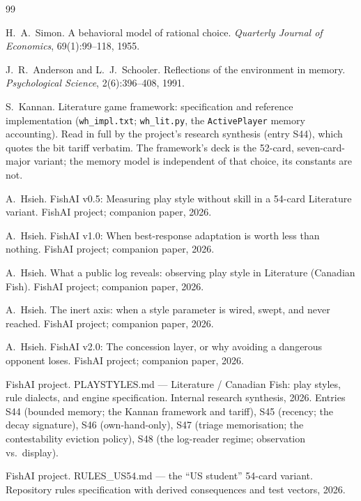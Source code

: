 \documentclass[11pt]{article}
\newcommand{\code}[1]{\texttt{#1}}
\begin{document}
\begin{thebibliography}{99}
\footnotesize

H.~A.~Simon.
\newblock A behavioral model of rational choice.
\newblock \emph{Quarterly Journal of Economics}, 69(1):99--118, 1955.

J.~R.~Anderson and L.~J.~Schooler.
\newblock Reflections of the environment in memory.
\newblock \emph{Psychological Science}, 2(6):396--408, 1991.

S.~Kannan.
\newblock Literature game framework: specification and reference implementation
(\code{wh\_impl.txt}; \code{wh\_lit.py}, the \code{ActivePlayer} memory accounting).
\newblock Read in full by the project's research synthesis \cite{playstyles} (entry
S44), which quotes the bit tariff verbatim. The framework's deck is the 52-card,
seven-card-major variant; the memory model is independent of that choice, its
constants are not.

A.~Hsieh.
\newblock FishAI v0.5: Measuring play style without skill in a 54-card Literature
variant.
\newblock FishAI project; companion paper, 2026.

A.~Hsieh.
\newblock FishAI v1.0: When best-response adaptation is worth less than nothing.
\newblock FishAI project; companion paper, 2026.

A.~Hsieh.
\newblock What a public log reveals: observing play style in Literature (Canadian
Fish).
\newblock FishAI project; companion paper, 2026.

A.~Hsieh.
\newblock The inert axis: when a style parameter is wired, swept, and never reached.
\newblock FishAI project; companion paper, 2026.

A.~Hsieh.
\newblock FishAI v2.0: The concession layer, or why avoiding a dangerous opponent loses.
\newblock FishAI project; companion paper, 2026.

FishAI project.
\newblock PLAYSTYLES.md --- Literature / Canadian Fish: play styles, rule dialects, and
engine specification.
\newblock Internal research synthesis, 2026. Entries S44 (bounded memory; the Kannan
framework and tariff), S45 (recency; the decay signature), S46 (own-hand-only), S47
(triage memorisation; the contestability eviction policy), S48 (the log-reader regime;
observation vs.\ display).

FishAI project.
\newblock RULES\_US54.md --- the ``US student'' 54-card variant.
\newblock Repository rules specification with derived consequences and test vectors,
2026.


\end{thebibliography}
\end{document}
